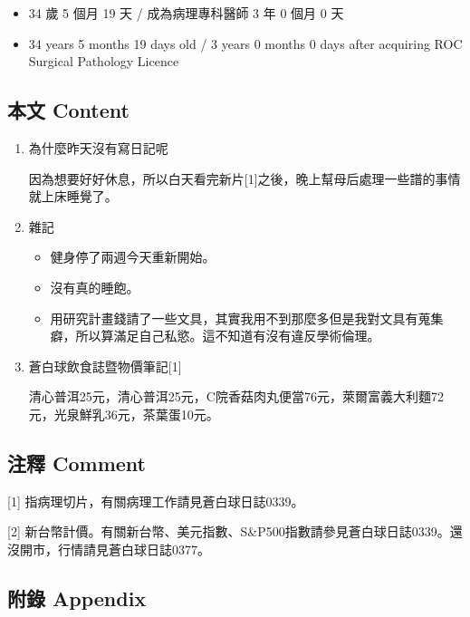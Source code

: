 \documentclass[
]{article}
\providecommand{\tightlist}{%
  \setlength{\itemsep}{0pt}\setlength{\parskip}{0pt}}
\begin{document}
\begin{itemize}
\tightlist
\item
  34 歲 5 個月 19 天 / 成為病理專科醫師 3 年 0 個月 0 天
\item
  34 years 5 months 19 days old / 3 years 0 months 0 days after
  acquiring ROC Surgical Pathology Licence
\end{itemize}

\hypertarget{ux672cux6587-content-10}{%
\subsection{本文 Content}\label{ux672cux6587-content-10}}

\begin{enumerate}
\def\labelenumi{\arabic{enumi}.}
\item
  為什麼昨天沒有寫日記呢

  因為想要好好休息，所以白天看完新片{[}1{]}之後，晚上幫母后處理一些譜的事情就上床睡覺了。
\item
  雜記

  \begin{itemize}
  \tightlist
  \item
    健身停了兩週今天重新開始。
  \item
    沒有真的睡飽。
  \item
    用研究計畫錢請了一些文具，其實我用不到那麼多但是我對文具有蒐集癖，所以算滿足自己私慾。這不知道有沒有違反學術倫理。
  \end{itemize}
\item
  蒼白球飲食誌暨物價筆記{[}1{]}

  清心普洱25元，清心普洱25元，C院香菇肉丸便當76元，萊爾富義大利麵72元，光泉鮮乳36元，茶葉蛋10元。
\end{enumerate}

\hypertarget{ux6ce8ux91cb-comment-10}{%
\subsection{注釋 Comment}\label{ux6ce8ux91cb-comment-10}}

{[}1{]} 指病理切片，有關病理工作請見蒼白球日誌0339。

{[}2{]}
新台幣計價。有關新台幣、美元指數、S\&P500指數請參見蒼白球日誌0339。還沒開市，行情請見蒼白球日誌0377。

\hypertarget{ux9644ux9304-appendix-10}{%
\subsection{附錄 Appendix}\label{ux9644ux9304-appendix-10}}
\end{document}
